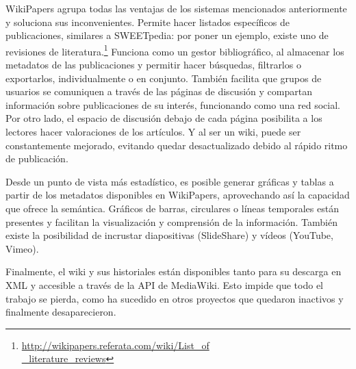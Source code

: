 \documentclass[11pt,onecolumn]{article}
\begin{document}
WikiPapers agrupa todas las ventajas de los sistemas mencionados anteriormente y soluciona sus inconvenientes. Permite hacer listados específicos de publicaciones, similares a SWEETpedia: por poner un ejemplo, existe uno de revisiones de literatura.\footnote{\href{http://wikipapers.referata.com/wiki/List_of_literature_reviews}{http://wikipapers.referata.com/wiki/List\_of\\ \_literature\_reviews}} Funciona como un gestor bibliográfico, al almacenar los metadatos de las publicaciones y permitir hacer búsquedas, filtrarlos o exportarlos, individualmente o en conjunto. También facilita que grupos de usuarios se comuniquen a través de las páginas de discusión y compartan información sobre publicaciones de su interés, funcionando como una red social. Por otro lado, el espacio de discusión debajo de cada página posibilita a los lectores hacer valoraciones de los artículos. Y al ser un wiki, puede ser constantemente mejorado, evitando quedar desactualizado debido al rápido ritmo de publicación.

Desde un punto de vista más estadístico, es posible generar gráficas y tablas a partir de los metadatos disponibles en WikiPapers, aprovechando así la capacidad que ofrece la semántica. Gráficos de barras, circulares o líneas temporales están presentes y facilitan la visualización y comprensión de la información. También existe la posibilidad de incrustar diapositivas (SlideShare) y vídeos (YouTube, Vimeo).

Finalmente, el wiki y sus historiales están disponibles tanto para su descarga en XML y accesible a través de la API de MediaWiki. Esto impide que todo el trabajo se pierda, como ha sucedido en otros proyectos que quedaron inactivos y finalmente desaparecieron.
\end{document}
